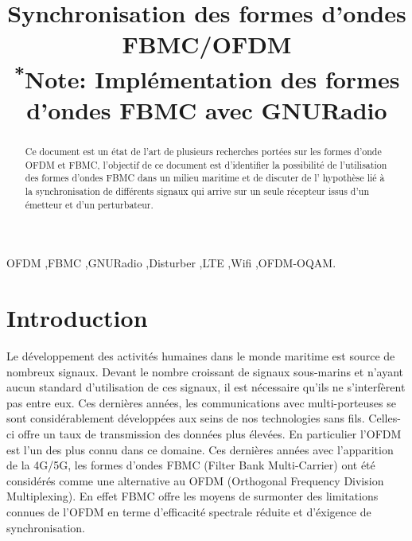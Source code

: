 \documentclass[conference]{IEEEtran}
\begin{document}
\title{Synchronisation des formes d'ondes FBMC/OFDM\\
{\footnotesize \textsuperscript{*}Note: Implémentation des formes d'ondes FBMC avec GNURadio}
}

\author{

\and
{}
}

\maketitle

\begin{IEEEkeywords}
  OFDM ,FBMC ,GNURadio ,Disturber ,LTE ,Wifi ,OFDM-OQAM.
\end{IEEEkeywords}

\begin{abstract}
Ce document est un état de l'art de plusieurs recherches portées sur les formes d'onde OFDM et FBMC, l'objectif de ce document est d'identifier la possibilité de l'utilisation des formes d'ondes FBMC dans un milieu maritime et de discuter de l' hypothèse lié à la synchronisation de différents signaux qui arrive sur un seule récepteur issus d'un émetteur et d'un perturbateur. 
\end{abstract}



\section{Introduction}
Le développement des activités humaines dans le monde maritime est source de nombreux signaux. Devant le nombre croissant de signaux sous-marins et n’ayant aucun standard d’utilisation de ces signaux, il est nécessaire qu'ils ne s'interfèrent pas entre eux. Ces dernières années, les communications avec multi-porteuses se sont considérablement développées aux seins de nos technologies sans fils. Celles-ci offre un taux de transmission des données plus élevées. En particulier l'OFDM est l’un des plus connu dans ce domaine. Ces dernières années avec l'apparition de la 4G/5G, les formes d’ondes FBMC (Filter Bank Multi-Carrier) ont été considérés comme une alternative au OFDM (Orthogonal Frequency Division Multiplexing). En effet FBMC offre les moyens de surmonter des limitations connues de l’OFDM en terme d’efficacité spectrale réduite et d’éxigence de synchronisation.
\end{document}
